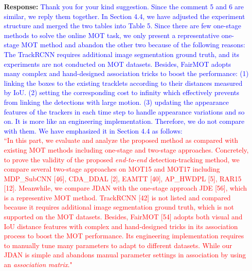 \documentclass[12pt,journal,onecolumn]{IEEEtran}
\begin{document}
\textbf{Response:} \textcolor{blue}{Thank you for your kind suggestion. 
Since the comment 5 and 6 are similar, we reply them together.
In Section 4.4, we have adjusted the experiment structure and merged the two tables into Table 5.
Since there are few one-stage methods to solve the online MOT task,
we only present a representative one-stage MOT method and abandon the other two because of the following reasons: 
} 
\textcolor{blue}{
The TrackRCNN requires additional image segmentation ground truth, and its experiments are not conducted on MOT datasets.
Besides, FairMOT adopts many complex and hand-designed association tricks to boost the performance: 
(1) linking the boxes to the existing tracklets according to their distances measured by IoU. 
(2) setting the corresponding cost to infinity which effectively prevents from linking the detections with large motion. 
(3) updating the appearance features of the trackers in each time step to handle appearance variations and so on.
It is more like an engineering implementation.
Therefore, we do not compare with them.
We have emphasized it in Section 4.4 as follows:\\
}
\textcolor{red}{
``In this part, we evaluate and analyze the proposed method as compared with existing MOT methods including one-stage and two-stage approaches. Concretely, to prove the validity of the proposed \emph{end-to-end} detection-tracking method, we compare several two-stage approaches on MOT15 and MOT17 including MDP\_SubCNN [46], CDA\_DDAL [2], EAMTT [40], AP\_HWDPL [5], RAR15 [12].
Meanwhile, we compare JDAN with the one-stage approach JDE [56], which is a representive MOT method.
TrackRCNN [42] is not listed and compared because it requires additional image segmentation ground truth, which is not supported on the MOT datasets.
Besides, FairMOT [54] adopts both visual and IoU distance features with complex and hand-designed tricks in its association process to boost the MOT performance.
Its engineering implementation requires to manually tune many parameters to adapt to different datasets.
While our JDAN is simple and abandons manual parameter settings in association by using an \emph{association matrix}."
} \\
\end{document}
